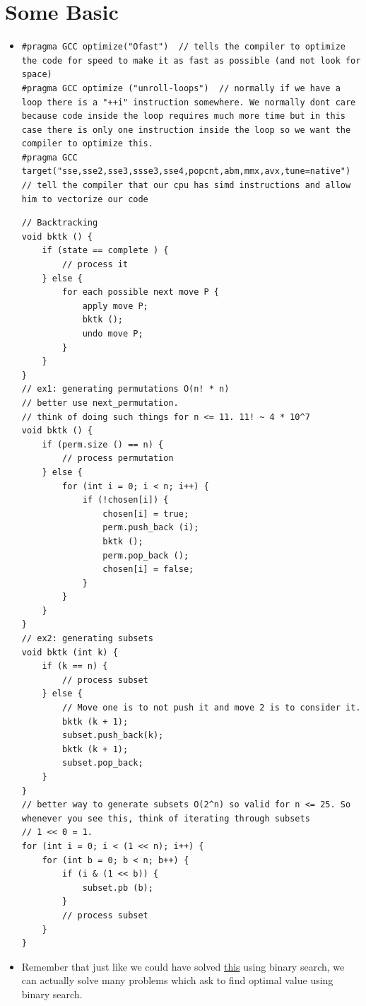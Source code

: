 \documentclass[8pt, a4paper, oneside, twocolumn]{extarticle}
\begin{document}
\section{Some Basic}
\begin{itemize}
    \item \begin{verbatim}
#pragma GCC optimize("Ofast")  // tells the compiler to optimize the code for speed to make it as fast as possible (and not look for space)
#pragma GCC optimize ("unroll-loops")  // normally if we have a loop there is a "++i" instruction somewhere. We normally dont care because code inside the loop requires much more time but in this case there is only one instruction inside the loop so we want the compiler to optimize this.
#pragma GCC target("sse,sse2,sse3,ssse3,sse4,popcnt,abm,mmx,avx,tune=native")  // tell the compiler that our cpu has simd instructions and allow him to vectorize our code
\end{verbatim}
\begin{verbatim}
// Backtracking
void bktk () {
    if (state == complete ) {
        // process it
    } else {
        for each possible next move P {
            apply move P;
            bktk ();
            undo move P;
        }
    }
}
// ex1: generating permutations O(n! * n)
// better use next_permutation. 
// think of doing such things for n <= 11. 11! ~ 4 * 10^7
void bktk () {
    if (perm.size () == n) {
        // process permutation 
    } else {
        for (int i = 0; i < n; i++) {
            if (!chosen[i]) {
                chosen[i] = true;
                perm.push_back (i);
                bktk ();
                perm.pop_back ();
                chosen[i] = false;
            }
        }
    }
}
// ex2: generating subsets
void bktk (int k) {
    if (k == n) {
        // process subset
    } else {
        // Move one is to not push it and move 2 is to consider it.
        bktk (k + 1);
        subset.push_back(k);
        bktk (k + 1);
        subset.pop_back;
    }
}
// better way to generate subsets O(2^n) so valid for n <= 25. So whenever you see this, think of iterating through subsets
// 1 << 0 = 1.
for (int i = 0; i < (1 << n); i++) {
    for (int b = 0; b < n; b++) {
        if (i & (1 << b)) {
            subset.pb (b);
        }
        // process subset
    }
}
\end{verbatim}
    \item Remember that just like we could have solved \href{}{this} using binary search, we can actually solve many problems which ask to find optimal value using binary search.

\end{itemize}
\end{document}
